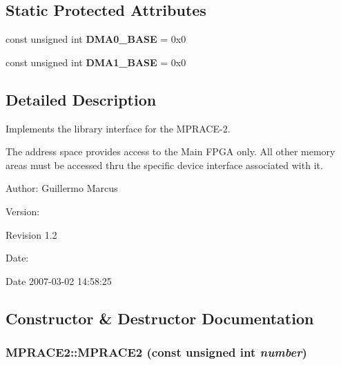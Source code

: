 \subsection*{Static Protected Attributes}
\begin{CompactItemize}
\item 
\hypertarget{classmprace_1_1MPRACE2_t0}{
const unsigned int {\bf DMA0\_\-BASE} = 0x0}
\label{classmprace_1_1MPRACE2_t0}

\item 
\hypertarget{classmprace_1_1MPRACE2_t1}{
const unsigned int {\bf DMA1\_\-BASE} = 0x0}
\label{classmprace_1_1MPRACE2_t1}

\end{CompactItemize}


\subsection{Detailed Description}
Implements the library interface for the MPRACE-2. 

The address space provides access to the Main FPGA only. All other memory areas must be accessed thru the specific device interface associated with it.

\begin{Desc}
\item[Author:]Guillermo Marcus \end{Desc}
\begin{Desc}
\item[Version:]\begin{Desc}
\item[Revision]1.2 \end{Desc}
\end{Desc}
\begin{Desc}
\item[Date:]\begin{Desc}
\item[Date]2007-03-02 14:58:25 \end{Desc}
\end{Desc}




\subsection{Constructor \& Destructor Documentation}
\hypertarget{classmprace_1_1MPRACE2_a0}{
\subsubsection[MPRACE2]{\setlength{\rightskip}{0pt plus 5cm}MPRACE2::MPRACE2 (const unsigned int {\em number})}}
\label{classmprace_1_1MPRACE2_a0}


